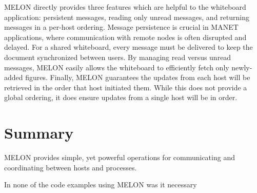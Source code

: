 MELON directly provides three features which are helpful to the whiteboard application: persistent messages, reading only unread messages, and returning messages in a per-host ordering. Message persistence is crucial in MANET applications, where communication with remote nodes is often disrupted and delayed. For a shared whiteboard, every message must be delivered to keep the document synchronized between users. By managing read versus unread messages, MELON easily allows the whiteboard to efficiently fetch only newly-added figures. Finally, MELON guarantees the updates from each host will be retrieved in the order that host initiated them. While this does not provide a global ordering, it does ensure updates from a single host will be in order.

\section{Summary}

MELON provides simple, yet powerful operations for communicating and coordinating between hosts and processes.

In none of the code examples using MELON was it necessary 